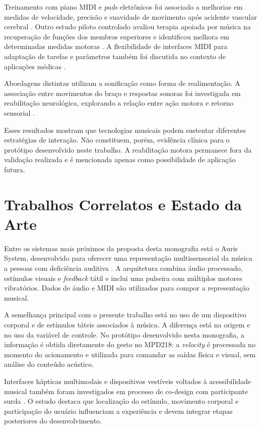 Treinamento com piano MIDI e \textit{pads} eletrônicos foi associado a melhorias em medidas de velocidade, precisão e suavidade de movimento após acidente vascular cerebral \cite{schneider2007}. Outro estudo piloto controlado avaliou terapia apoiada por música na recuperação de funções dos membros superiores e identificou melhora em determinadas medidas motoras \cite{tong2015}. A flexibilidade de interfaces MIDI para adaptação de tarefas e parâmetros também foi discutida no contexto de aplicações médicas \cite{kollar2017}.

Abordagens distintas utilizam a sonificação como forma de realimentação. A associação entre movimentos do braço e respostas sonoras foi investigada em reabilitação neurológica, explorando a relação entre ação motora e retorno sensorial \cite{scholz2016}.

Esses resultados mostram que tecnologias musicais podem sustentar diferentes estratégias de interação. Não constituem, porém, evidência clínica para o protótipo desenvolvido neste trabalho. A reabilitação motora permanece fora da validação realizada e é mencionada apenas como possibilidade de aplicação futura.

\section{Trabalhos Correlatos e Estado da Arte}

Entre os sistemas mais próximos da proposta desta monografia está o Auris System, desenvolvido para oferecer uma representação multissensorial da música a pessoas com deficiência auditiva \cite{araujo2017}. A arquitetura combina áudio processado, estímulos visuais e \textit{feedback} tátil e inclui uma pulseira com múltiplos motores vibratórios. Dados de áudio e MIDI são utilizados para compor a representação musical.

A semelhança principal com o presente trabalho está no uso de um dispositivo corporal e de estímulos táteis associados à música. A diferença está na origem e no uso da variável de controle. No protótipo desenvolvido nesta monografia, a informação é obtida diretamente do gesto no MPD218: a \textit{velocity} é processada no momento do acionamento e utilizada para comandar as saídas física e visual, sem análise do conteúdo acústico.

Interfaces hápticas multimodais e dispositivos vestíveis voltados à acessibilidade musical também foram investigados em processo de co-design com participante surda \cite{cavdir2024}. O estudo destaca que localização do estímulo, movimento corporal e participação do usuário influenciam a experiência e devem integrar etapas posteriores do desenvolvimento.

